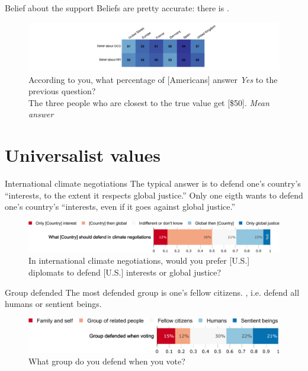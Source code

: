 \begin{framefont}{\small}
\begin{frame}{Belief about the support\label{}}
	\bbvs \ip Beliefs are pretty accurate: there is .
    \ee
    \begin{figure}
        \centering 
        \caption{According to you, what percentage of [Americans] answer \textit{Yes} to the previous question? \\ The three people who are closest to the true value get [\$50].  \textit{Mean answer}
        }
        \vspace{-.2cm}
        \includegraphics[height=.5\textheight]{../figures/country_comparison/belief_mean.pdf} 
    \end{figure}
\end{frame}

\section{Universalist values}

\begin{frame}{International climate negotiations\label{}}
	\bbvs \ip The typical answer is to defend one's country's ``interests, to the extent it respects global justice.''
    \ip Only one eigth wants to defend one's country's ``interests, even if it goes against global justice.''
    \ee
    \begin{figure}
        \centering 
        \caption{In international climate negotiations, would you prefer [U.S.] diplomats to defend [U.S.] interests or global justice?
        }
        \vspace{-.2cm}
        \includegraphics[width=\textwidth]{../figures/all/negotiation.pdf} 
    \end{figure}
\end{frame}

\begin{frame}{Group defended\label{}}
	\bbvs \ip The most defended group is one's fellow citizens.
    \ip {}, i.e. defend all humans or sentient beings.
    \ee
    \begin{figure}
        \centering 
        \caption{What group do you defend when you vote?
        }
        \vspace{-.2cm}
        \includegraphics[width=\textwidth]{../figures/all/group_defended_agg2.pdf} 
    \end{figure}
\end{frame}


\end{framefont}
